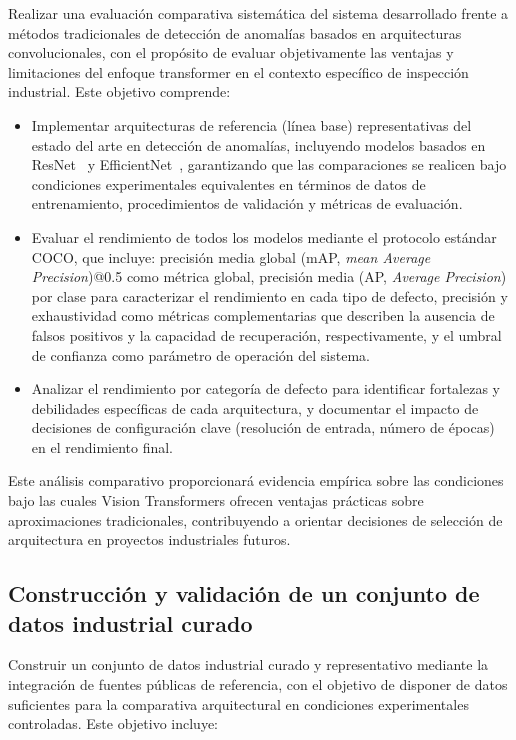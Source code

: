 Realizar una evaluación comparativa sistemática del sistema desarrollado frente a métodos tradicionales de detección de anomalías basados en arquitecturas convolucionales, con el propósito de evaluar objetivamente las ventajas y limitaciones del enfoque transformer en el contexto específico de inspección industrial. Este objetivo comprende:

\begin{itemize}
    \item Implementar arquitecturas de referencia (línea base) representativas del estado del arte en detección de anomalías, incluyendo modelos basados en ResNet~\cite{he2016resnet} y EfficientNet~\cite{tan2019efficientnet}, garantizando que las comparaciones se realicen bajo condiciones experimentales equivalentes en términos de datos de entrenamiento, procedimientos de validación y métricas de evaluación.
    
    \item Evaluar el rendimiento de todos los modelos mediante el protocolo estándar COCO, que incluye: precisión media global (mAP, \textit{mean Average Precision})@0.5 como métrica global, precisión media (AP, \textit{Average Precision}) por clase para caracterizar el rendimiento en cada tipo de defecto, precisión y exhaustividad como métricas complementarias que describen la ausencia de falsos positivos y la capacidad de recuperación, respectivamente, y el umbral de confianza como parámetro de operación del sistema.

    \item Analizar el rendimiento por categoría de defecto para identificar fortalezas y debilidades específicas de cada arquitectura, y documentar el impacto de decisiones de configuración clave (resolución de entrada, número de épocas) en el rendimiento final.
\end{itemize}

Este análisis comparativo proporcionará evidencia empírica sobre las condiciones bajo las cuales Vision Transformers ofrecen ventajas prácticas sobre aproximaciones tradicionales, contribuyendo a orientar decisiones de selección de arquitectura en proyectos industriales futuros.

\subsection{Construcción y validación de un conjunto de datos industrial curado}

Construir un conjunto de datos industrial curado y representativo mediante la integración de fuentes públicas de referencia, con el objetivo de disponer de datos suficientes para la comparativa arquitectural en condiciones experimentales controladas. Este objetivo incluye:

